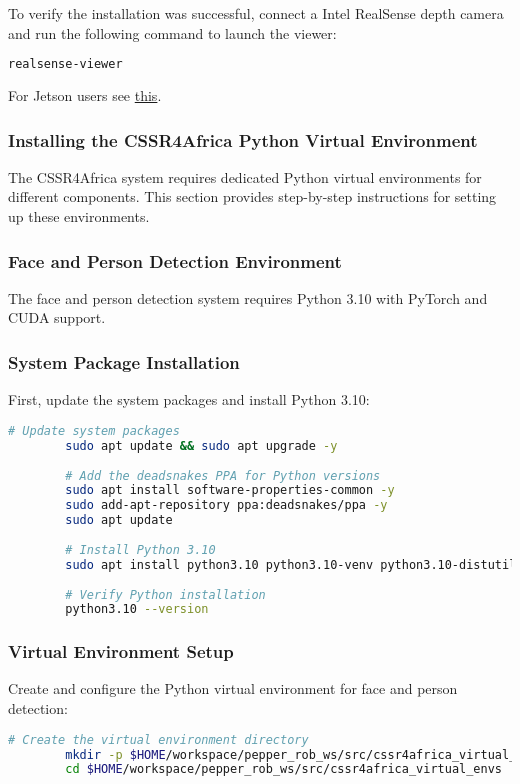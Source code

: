 \documentclass{CSSRforAfrica}
\begin{document}
{		To verify the installation was successful, connect a Intel RealSense depth camera and run the following command to launch the viewer:
		
		\begin{lstlisting}[style=withoutNumbering, language=bash]
		realsense-viewer
		\end{lstlisting}
		
		For Jetson users see \href{https://github.com/IntelRealSense/librealsense/blob/master/doc/installation_jetson.md}{this}. 
		
		\subsubsection{Installing the CSSR4Africa Python Virtual Environment}
		The CSSR4Africa system requires dedicated Python virtual environments for different components. This section provides step-by-step instructions for setting up these environments.
		
		
		\subsubsection*{Face and Person Detection Environment}
		The face and person detection system requires Python 3.10 with PyTorch and CUDA support.
		
		\subsubsection*{System Package Installation}
		First, update the system packages and install Python 3.10:
		\begin{lstlisting}[style=withoutNumbering, language=bash]
		# Update system packages
		sudo apt update && sudo apt upgrade -y
		
		# Add the deadsnakes PPA for Python versions
		sudo apt install software-properties-common -y
		sudo add-apt-repository ppa:deadsnakes/ppa -y
		sudo apt update
		
		# Install Python 3.10
		sudo apt install python3.10 python3.10-venv python3.10-distutils -y
		
		# Verify Python installation
		python3.10 --version
		\end{lstlisting}
		
		\subsubsection*{Virtual Environment Setup}
		Create and configure the Python virtual environment for face and person detection:
		\begin{lstlisting}[style=withoutNumbering, language=bash]
		# Create the virtual environment directory
		mkdir -p $HOME/workspace/pepper_rob_ws/src/cssr4africa_virtual_envs
		cd $HOME/workspace/pepper_rob_ws/src/cssr4africa_virtual_envs
		

\end{lstlisting}}
\end{document}
